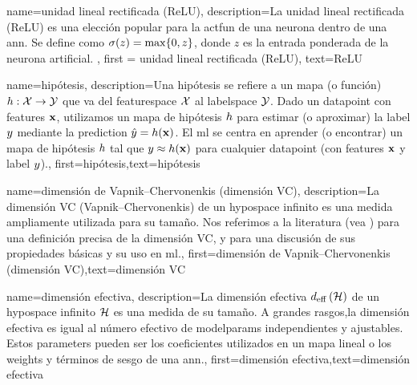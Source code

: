 {name={unidad lineal rectificada (ReLU)},
	description={La unidad lineal rectificada (ReLU) es una elección popular para la 
		\gls{actfun} de una neurona dentro de una \gls{ann}. Se define como  
		$\sigma(z) = \max\{0,z\}$, donde $z$ es la entrada ponderada de la neurona artificial.
		}, 
	first = {unidad lineal rectificada (ReLU)}, text={ReLU} 
}

{name={hipótesis},
	description={Una hipótesis se refiere a un mapa (o función) $h: \mathcal{X} \rightarrow \mathcal{Y}$ que va del
		\gls{featurespace} $\mathcal{X}$ al \gls{labelspace} $\mathcal{Y}$. 
		Dado un \gls{datapoint} con \gls{feature}s ${\bf x}$, utilizamos un mapa de hipótesis $h$
		para estimar (o aproximar) la \gls{label} $y$ mediante la \gls{prediction}  
		$\hat{y} = h({\bf x})$. El \Gls{ml} se centra en aprender (o encontrar) un mapa de hipótesis 
		$h$ tal que $y \approx h({\bf x})$ 
		para cualquier \gls{datapoint} (con \gls{feature}s ${\bf x}$ y \gls{label} $y$).},
	first={hipótesis},text={hipótesis}  
}



{name={dimensión de Vapnik–Chervonenkis (dimensión VC)},
	description={La dimensión VC (Vapnik–Chervonenkis) de un \gls{hypospace} infinito es una medida ampliamente utilizada para su tamaño.
		Nos referimos a la literatura (vea \cite{ShalevMLBook}) para una definición precisa de la dimensión VC,
		y para una discusión de sus propiedades básicas y su uso en \gls{ml}.},
	first={dimensión de Vapnik–Chervonenkis (dimensión VC)},text={dimensión VC}  
}

{name={dimensión efectiva},
	description={La dimensión efectiva $d_{\rm eff} \left( \mathcal{H} \right)$ de un 
		\gls{hypospace} infinito $\mathcal{H}$ es una medida de su tamaño. A grandes rasgos,la 
		dimensión efectiva es igual al número efectivo de \gls{modelparams} independientes y ajustables. 
		Estos \gls{parameters} pueden ser los coeficientes utilizados en un mapa lineal o los 
		\gls{weights} y términos de sesgo de una \gls{ann}.},
	first={dimensión efectiva},text={dimensión efectiva}  
}

